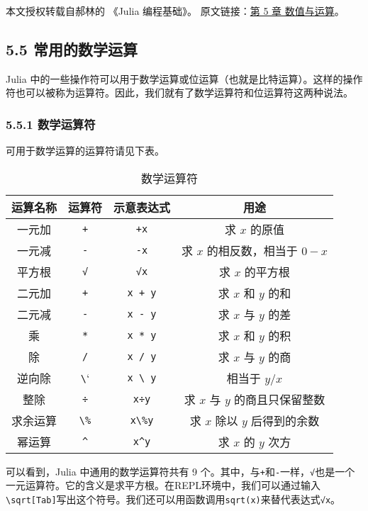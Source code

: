 
本文授权转载自郝林的 《Julia 编程基础》。 原文链接：\href{https://github.com/hyper0x/JuliaBasics/blob/master/book/ch05.md}{第 5 章 数值与运算}。


\subsection{5.5 常用的数学运算}

Julia 中的一些操作符可以用于数学运算或位运算（也就是比特运算）。这样的操作符也可以被称为运算符。因此，我们就有了数学运算符和位运算符这两种说法。

\subsubsection{5.5.1 数学运算符}

可用于数学运算的运算符请见下表。
\begin{table}[ht]
\centering
\caption{数学运算符}\label{tab_JuC5S5_1}
\begin{tabular}{|c|c|c|c|}
\hline
运算名称 & 运算符 & 示意表达式 & 用途 \\
\hline
一元加 & \verb`+` & \verb`+x` & 求 $x$ 的原值 \\
\hline
一元减 & \verb`-` & \verb`-x` & 求 $x$ 的相反数，相当于 $0-x$ \\
\hline
平方根 & \verb`√`  & \verb`√x` & 求 $x$ 的平方根 \\
\hline
二元加 & \verb`+` & \verb`x + y` & 求 $x$ 和 $y$ 的和 \\
\hline
二元减 & \verb`-` & \verb`x - y` & 求 $x$ 与 $y$ 的差 \\
\hline
乘 & \verb`*` & \verb`x * y` & 求 $x$ 和 $y$ 的积 \\
\hline
除 & \verb`/` & \verb`x / y` & 求 $x$ 与 $y$ 的商 \\
\hline
逆向除 & \verb`\` & \verb`x \ y` & 相当于 $y / x$ \\
\hline
整除 & \verb`÷` & \verb`x÷y` & 求 $x$ 与 $y$ 的商且只保留整数 \\
\hline
求余运算 & \verb`\%` & \verb`x\%y` & 求 $x$ 除以 $y$ 后得到的余数 \\
\hline
幂运算 & \verb`^` & \verb`x^y` & 求 $x$ 的 $y$ 次方 \\
\hline
\end{tabular}
\end{table}

可以看到，Julia 中通用的数学运算符共有 9 个。其中，与\verb`+`和\verb`-`一样，\verb`√`也是一个一元运算符。它的含义是求平方根。在REPL环境中，我们可以通过输入\verb`\sqrt[Tab]`写出这个符号。我们还可以用函数调用\verb`sqrt(x)`来替代表达式\verb`√x`。

